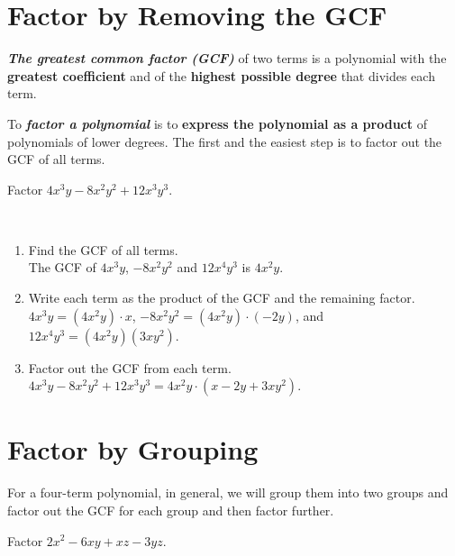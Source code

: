 \documentclass[en,11pt]{elegantbook}
\let\BeginKnitrBlock\begin \let\EndKnitrBlock\end
\begin{document}
\hypertarget{factor-by-removing-the-gcf}{%
\section{Factor by Removing the GCF}\label{factor-by-removing-the-gcf}}

\textbf{\emph{The greatest common factor (GCF)}} of two terms is a polynomial with the \textbf{greatest coefficient} and of the \textbf{highest possible degree} that divides each term.

To \textbf{\emph{factor a polynomial}} is to \textbf{express the polynomial as a product} of polynomials of lower degrees. The first and the easiest step is to factor out the GCF of all terms.

\BeginKnitrBlock{example}
\protect\hypertarget{exm:unnamed-chunk-8}{}{\label{exm:unnamed-chunk-8} }
Factor \(4x^3y-8x^2y^2+12x^3y^3\).
\EndKnitrBlock{example}

\BeginKnitrBlock{solution}
{}~

\begin{enumerate}
\def\labelenumi{\arabic{enumi}.}

\item
  Find the GCF of all terms.\\
  The GCF of \(4x^3y\), \(-8x^2y^2\) and \(12x^4y^3\) is \(4x^2y\).
\item
  Write each term as the product of the GCF and the remaining factor.\\
  \(4x^3y=(4x^2y)\cdot x\), \(-8x^2y^2=(4x^2y)\cdot (-2y)\), and \(12x^4y^3=(4x^2y)(3xy^2)\).
\item
  Factor out the GCF from each term.\\
  \(4x^3y-8x^2y^2+12x^3y^3=4x^2y\cdot(x-2y+3xy^2)\).
\end{enumerate}
\EndKnitrBlock{solution}

\hypertarget{factor-by-grouping}{%
\section{Factor by Grouping}\label{factor-by-grouping}}

For a four-term polynomial, in general, we will group them into two groups and factor out the GCF for each group and then factor further.

\BeginKnitrBlock{example}
\protect\hypertarget{exm:unnamed-chunk-10}{}{\label{exm:unnamed-chunk-10} }
Factor \(2x^2-6xy+xz-3yz\).
\EndKnitrBlock{example}
\end{document}
